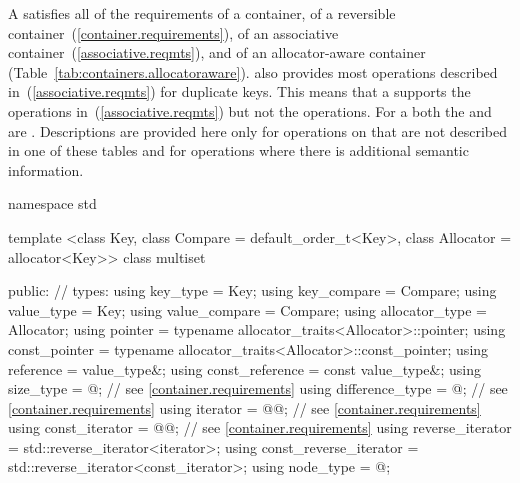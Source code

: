 \pnum
A  satisfies all of the requirements of a container, of a
reversible container~(\ref{container.requirements}), of an associative
container~(\ref{associative.reqmts}), and of an allocator-aware container
(Table~\ref{tab:containers.allocatoraware}).
also provides most operations described in~(\ref{associative.reqmts})
for duplicate keys.
This means that a
supports the
operations in~(\ref{associative.reqmts})
but not the
operations.
For a
both the
and
are
.
Descriptions are provided here only for operations on
that are not described in one of these tables
and for operations where there is additional semantic information.

\begin{codeblock}
namespace std {
  template <class Key, class Compare = default_order_t<Key>,
            class Allocator = allocator<Key>>
  class multiset {
  public:
    // types:
    using key_type               = Key;
    using key_compare            = Compare;
    using value_type             = Key;
    using value_compare          = Compare;
    using allocator_type         = Allocator;
    using pointer                = typename allocator_traits<Allocator>::pointer;
    using const_pointer          = typename allocator_traits<Allocator>::const_pointer;
    using reference              = value_type&;
    using const_reference        = const value_type&;
    using size_type              = @\impdef@; // see \ref{container.requirements}
    using difference_type        = @\impdef@; // see \ref{container.requirements}
    using iterator               = @@; // see \ref{container.requirements}
    using const_iterator         = @@; // see \ref{container.requirements}
    using reverse_iterator       = std::reverse_iterator<iterator>;
    using const_reverse_iterator = std::reverse_iterator<const_iterator>;
    using node_type              = @\unspec@;

}}
\end{codeblock}

